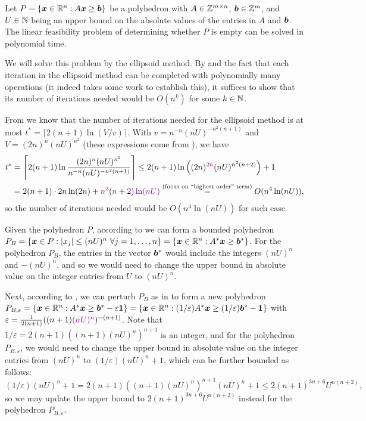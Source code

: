 \begin{enumerate}
\begin{theorem}
\label{thm:feas-prob-poly-time}
Let \(P=\{\bm{x}\in\mathbb{R}^n:A\bm{x}\ge\bm{b}\}\) be a polyhedron with
\(A\in\mathbb{Z}^{m\times n}\), \(\bm{b}\in \mathbb{Z}^{m}\), and \(U\in\mathbb{N}\) being an upper
bound on the absolute values of the entries in \(A\) and \(\bm{b}\). The
linear feasibility problem of determining whether \(P\) is empty can be solved
in polynomial time.
\end{theorem}
\begin{pf}
We will solve this problem by the ellipsoid method.  By
 and the fact that each iteration in the
ellipsoid method can be completed with polynomially many operations (it indeed
takes some work to establish this), it suffices to show that its number of
iterations needed would be \(O(n^k)\) for some \(k\in\mathbb{N}\).

From  we know that the number of
iterations needed for the ellipsoid method is at most \(t^{*}=\lceil 2(n+1)\ln
(V/v)\rceil\). With \(v=n^{-n}(nU)^{-n^{2}(n+1)}\) and \(V=(2n)^{n}(nU)^{n^{2}}\)
(these expressions come from
), we have
\begin{align*}
t^{*}&=\left\lceil 2(n+1)\ln \frac{(2n)^{n}(nU)^{n^{2}}}{n^{-n}(nU)^{-n^{2}(n+1)}}\right\rceil
\le 2(n+1)\ln\left((2n)^{\vc{2n}}(nU)^{n^{2}(n+2)}\right)+1 \\
&= 2(n+1)\cdot 2n\ln (2n)+\vc{n^{2}}(\vc{n}+2)\vc{\ln (nU)}
\overset{\text{(focus on ``highest order'' term)}}{=}O(n^{4}\ln (nU)),
\end{align*}
so the number of iterations needed would be \(O(n^{4}\ln (nU))\) for such case.

Given the polyhedron \(P\), according to  we can
form a bounded polyhedron \(P_{B}=\{\bm{x}\in P:|x_j|\le (nU)^{n}~\forall
j=1,\dotsc,n\}=\{\bm{x}\in\mathbb{R}^n: A^*\bm{x}\ge\bm{b}^*\}\). For the
polyhedron \(P_{B}\), the entries in the vector \(\bm{b}^*\) would include
the integers \((nU)^{n}\) and \(-(nU)^{n}\), and so we would need to change the
upper bound in absolute value on the integer entries from \(U\) to
\((nU)^{n}\).

Next, according to , we can perturb \(P_{B}\)
as in  to form a new polyhedron
\(P_{B,\varepsilon}=\{\bm{x}\in\mathbb{R}^n:A^{*}\bm{x}\ge\bm{b}^{*}-\varepsilon\bm{1}\}
=\{\bm{x}\in\mathbb{R}^n:(1/\varepsilon)A^{*}\bm{x}\ge (1/\varepsilon)\bm{b}^{*}-\bm{1}\}\) with
\(\varepsilon=\frac{1}{2(n+1)}((n+1)\vc{(nU)^{n}})^{-(n+1)}\). Note that \(1/\varepsilon
=2(n+1)((n+1)(nU)^{n})^{n+1}\) is an integer,
and for the polyhedron \(P_{B,\varepsilon}\), we would need to change the upper
bound in absolute value on the integer entries from \((nU)^{n}\) to
\((1/\varepsilon)(nU)^{n}+1\), which can be further bounded as follows:
\[(1/\varepsilon)(nU)^{n}+1
=2(n+1)((n+1)(nU)^{n})^{n+1}(nU)^{n}+1
\le 2(n+1)^{3n+6}U^{n(n+2)},
\]
so we may update the upper bound to \(2(n+1)^{3n+6}U^{n(n+2)}\) instead for the
polyhedron \(P_{B,\varepsilon}\).


\end{pf}
\end{enumerate}
